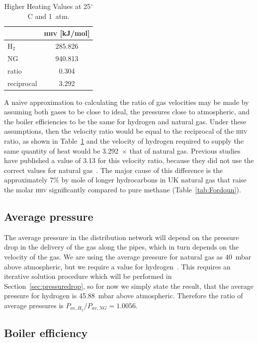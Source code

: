 \documentclass[5p]{elsarticle} %
\begin{document}
\begin{table}[ht]
\centering
\caption{\label{tab:combust}Higher Heating Values at 25$^\circ$C and 1~atm.} 
\begin{tabular}{l|c}
    & \textsc{hhv} [kJ/mol]\\
    \hline
    H$_2$ & 285.826 \\
    NG & 940.813 \\
    \hline
    ratio & 0.304  \\
    reciprocal & 3.292 \\
\end{tabular}
\end{table}

A naive approximation to calculating the ratio of gas velocities may be made by assuming both gases to be close to ideal, the pressures close to atmospheric, and the boiler efficiencies to be the same for hydrogen and natural gas.
Under these assumptions, then the velocity ratio would be equal to the reciprocal of the \textsc{hhv} ratio, as shown in Table~\ref{tab:combust} and the velocity of hydrogen required to supply the same quantity of  heat would be 3.292~$\times$  that of natural gas. 
Previous studies have published a value of 3.13 for this velocity ratio, because they did not use the correct values for natural gas~\citep{dodds2013,bossel2006}. 
The major cause of this difference is the approximately 7\% by mole of longer hydrocarbons in UK natural gas that raise the molar \textsc{hhv} significantly compared to pure methane (Table~\ref{tab:Fordoun}).

\subsection{Average pressure}
\label{sec:avpressure}

The average pressure in the distribution network will depend on the pressure drop in the delivery of the gas along the pipes, which in turn depends on the velocity of the gas.
We are using the average pressure for natural gas as 40~mbar above atmospheric, but we require a value for hydrogen~\citep{utonomy23}. 
This requires an iterative solution procedure which will be performed in Section~\ref{sec:pressuredrop}, so for now we simply state the result, that the average pressure for hydrogen is 45.88~mbar above atmospheric.
Therefore the ratio of average pressures is ${P_{av,H_2}}/{P_{av,NG}} = 1.0056$.

\subsection{Boiler efficiency}
\label{sec:efficiency}
\end{document}
